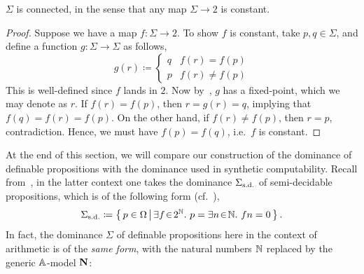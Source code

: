 \begin{corollary}
  $\Sigma$ is connected, in the sense that any map $\Sigma \to 2$ is constant.
\end{corollary}
\begin{proof}
  Suppose we have a map $f \colon \Sigma \to 2$. To show $f$ is constant, take $p,q\in\Sigma$, and define a function $g \colon \Sigma \to \Sigma$ as follows,
  \[ g(r) \coloneq
  \begin{cases}
    q & f(r) = f(p) \\
    p & f(r) \neq f(p)
  \end{cases}
  \]
  This is well-defined since $f$ lands in $2$. Now by~, $g$ has a fixed-point, which we may denote as $r$. If $f(r) = f(p)$, then $r = g(r) = q$, implying that $f(q) = f(r) = f(p)$. On the other hand, if $f(r) \neq f(p)$, then $r = p$, contradiction. Hence, we must have $f(p) = f(q)$, i.e.\ $f$ is constant.
\end{proof}

At the end of this section, we will compare our construction of the dominance of definable propositions with the dominance used in synthetic computability. Recall from~\cite{bauer_first_2006}, in the latter context one takes the dominance $\Sigma_{\mathrm{s.d.}}$ of semi-decidable propositions, which is of the following form (cf.~), 
\[ \Sigma_{\mathrm{s.d.}} \coloneq \left\{\,p\in\Omega\,\middle|\,\exists f\!\in\!2^{\mathbb{N}}.\  p = \exists n\!\in\!\mathbb{N}.\ fn = 0\,\right\}. \]
In fact, the dominance $\Sigma$ of definable propositions here in the context of arithmetic is of the \emph{same form}, with the natural numbers $\mathbb{N}$ replaced by the generic $\mathbb{A}$-model $\mathbf N$:

